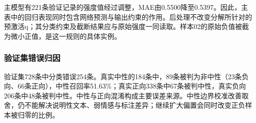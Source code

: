 主模型有221条验证记录的强度值经过调整，MAE由0.5500降至0.5397。因此，主表中的回归表现同时包含网络预测与输出约束的作用。后处理不改变分解所针对的预激活q；其分类约束及截断结果应与原始强度一同读取。样本02的原始负值被截为微小正值，是这一规则的具体实例。

\hypertarget{q3-ux9a8cux8bc1ux96c6ux9519ux8befux5f52ux56e0}{%
\subsubsection{验证集错误归因}\label{q3-ux9a8cux8bc1ux96c6ux9519ux8befux5f52ux56e0}}

验证集728条中分类错误254条。真实中性的184条中，89条被判为非中性（23条负向、66条正向），中性召回率51.63\%；真实正向338条中67条被判中性，真实负向206条中48条被判中性。中性与正向混淆构成主要误差来源。中性边界校准改善取舍，仍不能解决说明性文本、弱情感与标注差异；继续扩大偏置会同时改变正负样本被归零的比例。

